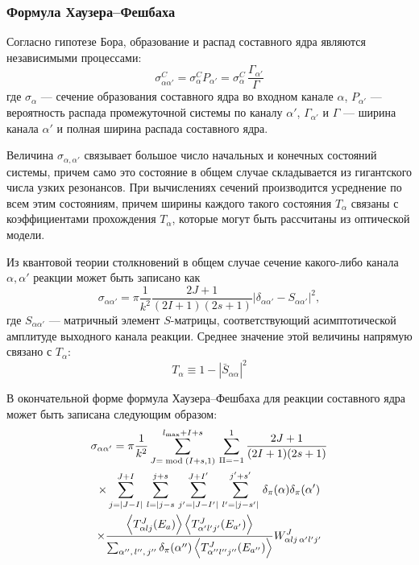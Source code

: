 \subsubsection{Формула Хаузера--Фешбаха}
Согласно гипотезе Бора, образование и распад составного ядра являются независимыми процессами:
\begin{equation}
\displaystyle
\sigma^C_{\alpha \alpha'} = \sigma^C_{\alpha}P_{\alpha'} = 
\sigma^C_{\alpha} \, \frac{\Gamma_{\alpha'}}{\Gamma}
\end{equation}
где $\sigma_{\alpha}$ --- сечение образования составного ядра во входном канале $\alpha$, $P_{\alpha'}$ --- вероятность распада промежуточной системы по каналу $\alpha'$, $\Gamma_{\alpha'}$ и $\Gamma$ --- ширина канала $\alpha'$ и полная ширина распада составного ядра.

Величина $\sigma_{\alpha,\alpha'}$ связывает большое число начальных и конечных состояний системы, причем само это состояние в общем случае складывается из гигантского числа узких резонансов. При вычислениях сечений производится усреднение по всем этим состояниям, причем ширины каждого такого состояния $T_\alpha$ связаны с коэффициентами прохождения $T_\alpha$, которые могут быть рассчитаны из оптической модели.

Из квантовой теории столкновений в общем случае сечение какого-либо канала $\alpha, \alpha'$ реакции может быть записано как
\begin{equation}
\displaystyle
\sigma_{\alpha \alpha'} = \pi \frac{1}{k^2} 
\frac{2J + 1}{(2I + 1)(2s + 1)}
|\delta_{\alpha \alpha'} - S_{\alpha \alpha'}|^2,
\end{equation}
где $S_{\alpha \alpha'}$ --- матричный элемент $S$-матрицы, соответствующий асимптотической амплитуде выходного канала реакции. Среднее значение этой величины напрямую связано с $T_\alpha$:
\begin{equation}
\displaystyle
T_\alpha \equiv 1 - |\bar{S}_{\alpha\alpha}|^2
\end{equation}

В окончательной форме формула Хаузера--Фешбаха для реакции составного ядра может быть записана следующим образом:
\begin{equation}
\begin{gathered}
\displaystyle
\sigma_{\alpha \alpha^\prime} = 
\pi \frac{1}{k^2}
\sum_{J=\bmod(I + s, 1)}^{l_\text{max} + I + s} \,
\sum_{\Pi=-1}^1 \frac{2J + 1}{(2I + 1)(2s + 1)} \\ \times
\sum_{j=|J-I|}^{J+I} \,
\sum_{l=|j-s}^{j+s} \,
\sum_{j^\prime=|J-I^\prime|}^{J+I^\prime} \,
\sum_{l^\prime=|j-s^\prime|}^{j^\prime+s^\prime} \,
\delta_\pi(\alpha) \delta_\pi(\alpha^\prime) \\ \times
\frac{
  \expval{T_{\alpha l j}^J(E_a)}
  \expval{T_{\alpha^\prime l^\prime j^\prime}^J(E_{a'})}
}{
  \sum_{\alpha'',\, l'',\, j''} \delta_\pi(\alpha'') 
  \expval{T_{\alpha'' l'' j''}^J(E_{a''})}
}
W^J_{\alpha l j \, \alpha' l' j'}
\end{gathered}
\label{eq:talys_cs}
\end{equation}

